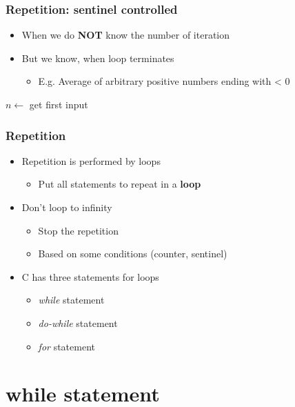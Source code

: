 \documentclass{../c-lecture}
\begin{document}
\begin{frame}
  \frametitle{Repetition: sentinel controlled}
  \begin{itemize}
    \item
      When we do \textbf{\color{RubineRed} NOT} know the number of iteration
    \item But we know, when loop terminates
    \begin{itemize}
      \item E.g. Average of arbitrary positive numbers ending with < 0
    \end{itemize}
  \end{itemize}
  \begin{algorithm}[H]
  \KwData{}
  \KwResult{}
  $n \gets$ get first input\;

  \end{algorithm}
\end{frame}

\begin{frame}
  \frametitle{Repetition}
  \begin{itemize}
    \item Repetition is performed by loops
    \begin{itemize}
      \item
        Put all statements to repeat in a \textbf{\color{Orange} loop}
    \end{itemize}
    \item Don’t loop to infinity
    \begin{itemize}
      \item Stop the repetition
      \item Based on some conditions (counter, sentinel)
    \end{itemize}
    \item C has three statements for loops
    \begin{itemize}
      \item \textit{\color{Orange} while} statement
      \item \textit{\color{Orange} do-while} statement
      \item \textit{\color{Orange} for} statement
    \end{itemize}
  \end{itemize}
\end{frame}

\section{while statement}
\end{document}

